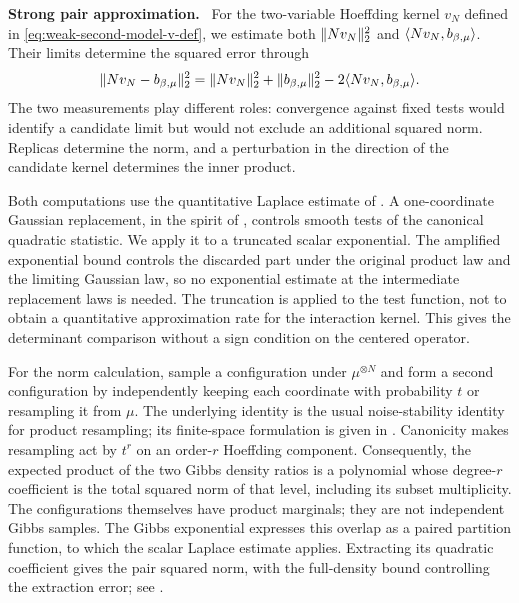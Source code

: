 \documentclass[11pt,reqno]{amsart}
\numberwithin{equation}{section}
\theoremstyle{plain}
\theoremstyle{remark}
\DeclarePairedDelimiter{\norm}{\lVert}{\rVert}
\DeclarePairedDelimiter{\ipp}{\langle}{\rangle}
\newcommand{\be}{\beta}
\newcommand{\parheading}[1]{\par\medskip\noindent\textbf{#1}\ }
\begin{document}
\parheading{Strong pair approximation.}
For the two-variable Hoeffding kernel $v_N$ defined in \eqref{eq:weak-second-model-v-def}, we estimate both $\norm{Nv_N}_2^2$ and $\ipp{Nv_N,b_{\be,\mu}}$.  Their limits determine the squared error through
\begin{equation}\label{eq:intro-pair-polarization}
 \norm{Nv_N-b_{\be,\mu}}_2^2
 =\norm{Nv_N}_2^2+\norm{b_{\be,\mu}}_2^2
       -2\ipp{Nv_N,b_{\be,\mu}}.
\end{equation}
The two measurements play different roles: convergence against fixed tests would identify a candidate limit but would not exclude an additional squared norm.  Replicas determine the norm, and a perturbation in the direction of the candidate kernel determines the inner product.

Both computations use the quantitative Laplace estimate of .  A one-coordinate Gaussian replacement, in the spirit of \cite[Section~2]{Chatterjee2006}, controls smooth tests of the canonical quadratic statistic.  We apply it to a truncated scalar exponential.  The amplified exponential bound controls the discarded part under the original product law and the limiting Gaussian law, so no exponential estimate at the intermediate replacement laws is needed.  The truncation is applied to the test function, not to obtain a quantitative approximation rate for the interaction kernel.  This gives the determinant comparison without a sign condition on the centered operator.

For the norm calculation, sample a configuration under $\mu^{\otimes N}$ and form a second configuration by independently keeping each coordinate with probability $t$ or resampling it from $\mu$.  The underlying identity is the usual noise-stability identity for product resampling; its finite-space formulation is given in \cite[Proposition~8.28 and Section~8.3]{ODonnell2014}.  Canonicity makes resampling act by $t^r$ on an order-$r$ Hoeffding component.  Consequently, the expected product of the two Gibbs density ratios is a polynomial whose degree-$r$ coefficient is the total squared norm of that level, including its subset multiplicity.  The configurations themselves have product marginals; they are not independent Gibbs samples.  The Gibbs exponential expresses this overlap as a paired partition function, to which the scalar Laplace estimate applies.  Extracting its quadratic coefficient gives the pair squared norm, with the full-density bound controlling the extraction error; see .
\end{document}
